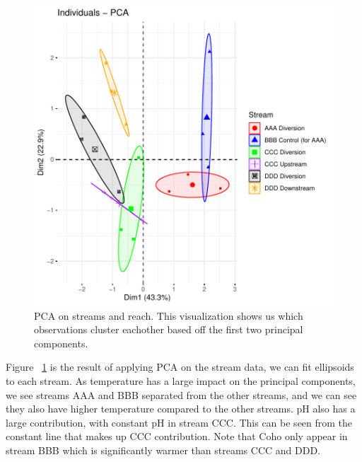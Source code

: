 \begin{figure}[H]
\includegraphics{Chapter5Images/streamPCA.pdf}
\caption{\hspace{1mm} PCA on streams and reach. This visualization shows us which observations cluster eachother based off the first two principal components.}
\label{fig:pcastream}
\end{figure}

Figure ~\ref{fig:pcastream} is the result of applying PCA on the stream data, we can fit ellipsoids to each stream. As temperature has a large impact on the principal components, we see streams AAA and BBB separated from the other streams, and we can see they also have higher temperature compared to the other streams. pH also has a large contribution, with constant pH in stream CCC. This can be seen from the constant line that makes up CCC contribution. Note that Coho only appear in stream BBB which is significantly warmer than streams CCC and DDD.